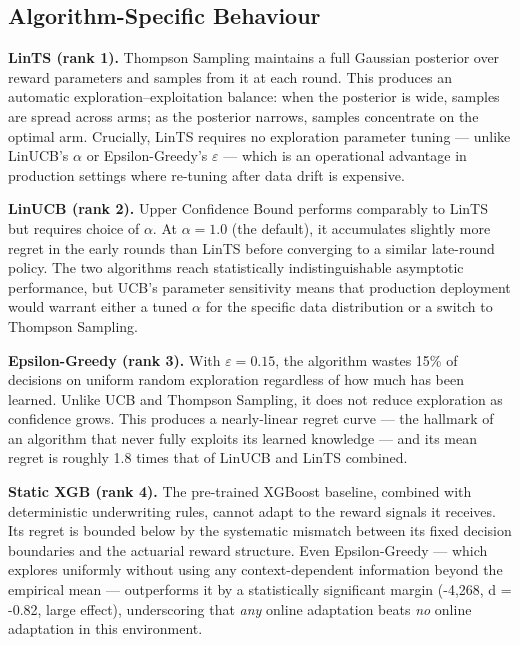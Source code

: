 \subsection{Algorithm-Specific Behaviour}\label{algorithm-specific-behaviour}

\textbf{LinTS (rank 1).} Thompson Sampling maintains a full Gaussian posterior over reward parameters and samples from it at each round. This produces an automatic exploration--exploitation balance: when the posterior is wide, samples are spread across arms; as the posterior narrows, samples concentrate on the optimal arm. Crucially, LinTS requires no exploration parameter tuning --- unlike LinUCB's \(\alpha\) or Epsilon-Greedy's \(\varepsilon\) --- which is an operational advantage in production settings where re-tuning after data drift is expensive.

\textbf{LinUCB (rank 2).} Upper Confidence Bound performs comparably to LinTS but requires choice of \(\alpha\). At \(\alpha = 1.0\) (the \citet{Li2010} default), it accumulates slightly more regret in the early rounds than LinTS before converging to a similar late-round policy. The two algorithms reach statistically indistinguishable asymptotic performance, but UCB's parameter sensitivity means that production deployment would warrant either a tuned \(\alpha\) for the specific data distribution or a switch to Thompson Sampling.

\textbf{Epsilon-Greedy (rank 3).} With \(\varepsilon = 0.15\), the algorithm wastes 15\% of decisions on uniform random exploration regardless of how much has been learned. Unlike UCB and Thompson Sampling, it does not reduce exploration as confidence grows. This produces a nearly-linear regret curve --- the hallmark of an algorithm that never fully exploits its learned knowledge --- and its mean regret is roughly 1.8 times that of LinUCB and LinTS combined.

\textbf{Static XGB (rank 4).} The pre-trained XGBoost baseline, combined with deterministic underwriting rules, cannot adapt to the reward signals it receives. Its regret is bounded below by the systematic mismatch between its fixed decision boundaries and the actuarial reward structure. Even Epsilon-Greedy --- which explores uniformly without using any context-dependent information beyond the empirical mean --- outperforms it by a statistically significant margin (-4,268, d = -0.82, large effect), underscoring that \emph{any} online adaptation beats \emph{no} online adaptation in this environment.

